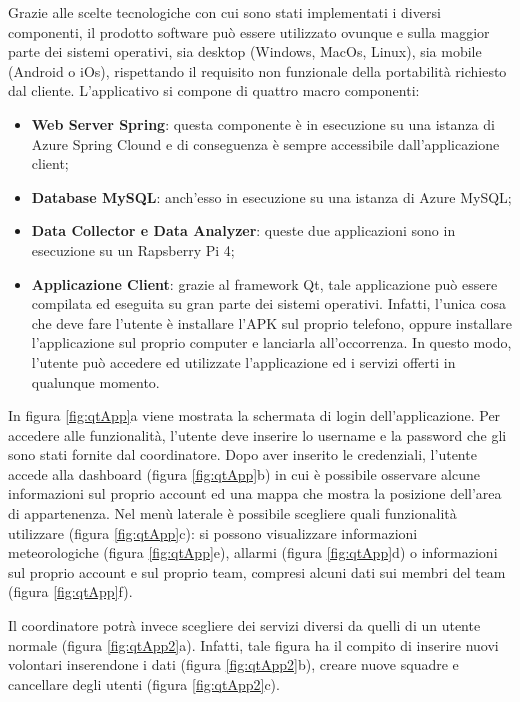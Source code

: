 
Grazie alle scelte tecnologiche con cui sono stati implementati i diversi componenti, il prodotto software può essere utilizzato ovunque e sulla maggior parte dei sistemi operativi, sia desktop (Windows, MacOs, Linux), sia mobile (Android o iOs), rispettando il requisito non funzionale della portabilità richiesto dal cliente.
L'applicativo si compone di quattro macro componenti:
\begin{itemize}
	\item \textbf{Web Server Spring}: questa componente è in esecuzione su una istanza di Azure Spring Clound e di conseguenza è sempre accessibile dall'applicazione client;
	\item \textbf{Database MySQL}: anch'esso in esecuzione su una istanza di Azure MySQL;
	\item \textbf{Data Collector e Data Analyzer}: queste due applicazioni sono in esecuzione su un Rapsberry Pi 4;
	\item \textbf{Applicazione Client}: grazie al framework Qt, tale applicazione può essere compilata ed eseguita su gran parte dei sistemi operativi. Infatti, l'unica cosa che deve fare l'utente è installare l'APK sul proprio telefono, oppure installare l'applicazione sul proprio computer e lanciarla all'occorrenza. In questo modo, l'utente può accedere ed utilizzate l'applicazione ed i servizi offerti in qualunque momento. 
\end{itemize}

In figura \ref{fig:qtApp}a viene mostrata la schermata di login dell'applicazione. Per accedere alle funzionalità, l'utente deve inserire lo username e la password che gli sono stati fornite dal coordinatore. 
Dopo aver inserito le credenziali, l'utente accede alla dashboard (figura \ref{fig:qtApp}b) in cui è possibile osservare alcune informazioni sul proprio account ed una mappa che mostra la posizione dell'area di appartenenza.
Nel menù laterale è possibile scegliere quali funzionalità utilizzare (figura \ref{fig:qtApp}c): si possono visualizzare informazioni meteorologiche (figura \ref{fig:qtApp}e), allarmi (figura \ref{fig:qtApp}d) o informazioni sul proprio account e sul proprio team, compresi alcuni dati sui membri del team (figura \ref{fig:qtApp}f).

Il coordinatore potrà invece scegliere dei servizi diversi da quelli di un utente normale (figura \ref{fig:qtApp2}a). Infatti, tale figura ha il compito di inserire nuovi volontari inserendone i dati (figura \ref{fig:qtApp2}b), creare nuove squadre e cancellare degli utenti (figura \ref{fig:qtApp2}c).

